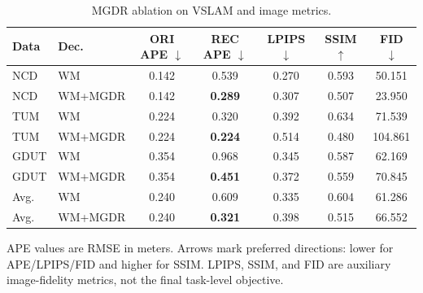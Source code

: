\begin{table}[!htbp]
\renewcommand{\arraystretch}{1.14}
\caption{MGDR ablation on VSLAM and image metrics.}
\label{tab:lora_ablation}
\centering
\footnotesize
\setlength{\tabcolsep}{2pt}
\begin{tabular*}{\columnwidth}{@{\extracolsep{\fill}}llccccc@{}}
\toprule
Data & Dec. & ORI APE $\downarrow$ & REC APE $\downarrow$ & LPIPS $\downarrow$ & SSIM $\uparrow$ & FID $\downarrow$ \\
\midrule
NCD & WM & 0.142 & 0.539 & 0.270 & 0.593 & 50.151 \\
NCD & WM+MGDR & 0.142 & \textbf{0.289} & 0.307 & 0.507 & 23.950 \\
TUM & WM & 0.224 & 0.320 & 0.392 & 0.634 & 71.539 \\
TUM & WM+MGDR & 0.224 & \textbf{0.224} & 0.514 & 0.480 & 104.861 \\
GDUT & WM & 0.354 & 0.968 & 0.345 & 0.587 & 62.169 \\
GDUT & WM+MGDR & 0.354 & \textbf{0.451} & 0.372 & 0.559 & 70.845 \\
Avg. & WM & 0.240 & 0.609 & 0.335 & 0.604 & 61.286 \\
Avg. & WM+MGDR & 0.240 & \textbf{0.321} & 0.398 & 0.515 & 66.552 \\
\bottomrule
\end{tabular*}%
\vspace{0.2em}

\parbox{\columnwidth}{\footnotesize APE values are RMSE in meters. Arrows mark preferred directions: lower for APE/LPIPS/FID and higher for SSIM. LPIPS, SSIM, and FID are auxiliary image-fidelity metrics, not the final task-level objective.}
\end{table}
